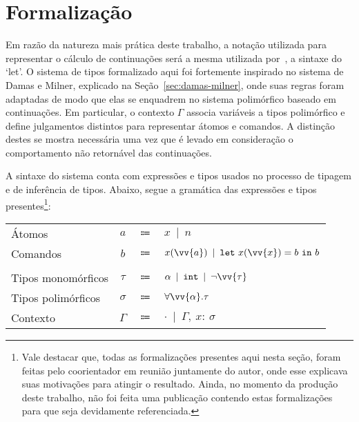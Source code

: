 \newcommand{\Mgu}{\ensuremath{\textit{mgu}}}
\newcommand{\MguList}{\ensuremath{\textit{mguList}}}
\newcommand{\UnifyVar}{\ensuremath{\textit{varBind}}}
\newcommand{\HeadSep}{\ensuremath{\textit{:}}}
\newcommand{\Length}{\ensuremath{\textit{length}}}
\newcommand{\List}{\ensuremath{\textit{list}}}


\section{Formalização}\label{sec:formalizacao}

Em razão da natureza mais prática deste trabalho, a notação utilizada para representar o cálculo de continuações será a mesma utilizada por~, a sintaxe do `let'.
O sistema de tipos formalizado aqui foi fortemente inspirado no sistema de Damas e Milner, explicado na Seção~\ref{sec:damas-milner}, onde suas regras foram adaptadas de modo que elas se enquadrem no sistema polimórfico baseado em continuações.
Em particular, o contexto $\Gamma$ associa variáveis a tipos polimórfico e define julgamentos distintos para representar átomos e comandos.
A distinção destes se mostra necessária uma vez que é levado em consideração o comportamento não retornável das continuações. 

A sintaxe do sistema conta com expressões e tipos usados no processo de tipagem e de inferência de tipos.
Abaixo, segue a gramática das expressões e tipos presentes\footnote{Vale destacar que, todas as formalizações presentes aqui nesta seção, foram feitas pelo coorientador em reunião juntamente do autor, onde esse explicava suas motivações para atingir o resultado. Ainda, no momento da produção deste trabalho, não foi feita uma publicação contendo estas formalizações para que seja devidamente referenciada.}:

\phantom{Newline}

\begin{tabular}{lccl}
  Átomos & $a$ & $\Coloneqq$ & $x \enspace|\enspace n$ \\
  Comandos & $b$ & $\Coloneqq$ & $x(\vv{a}) \enspace|\enspace \mathtt{let}\ x(\vv{x}) = b\ \mathtt{in}\ b$ \\
  \\
  Tipos monomórficos & $\tau$ & $\Coloneqq$ & $\alpha \enspace|\enspace \mathtt{int} \enspace|\enspace \neg\vv{\tau}$ \\
  Tipos polimórficos & $\sigma$ & $\Coloneqq$ & $\forall\vv{\alpha}.\tau$ \\
  Contexto & $\Gamma$ & $\Coloneqq$ & $\cdot \enspace|\enspace \Gamma,\ x{:}\ \sigma$ \\
\end{tabular}\label{cps-type-system}

